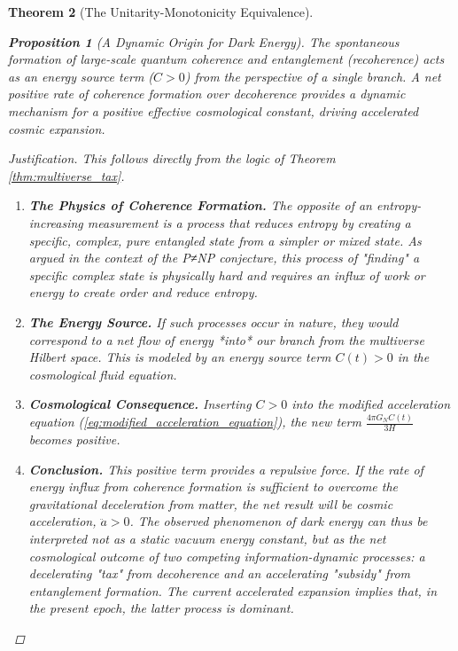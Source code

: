 \documentclass[11pt, letterpaper]{report}
\theoremstyle{plain} %
\newtheorem{theorem}{Theorem}[chapter]
\newtheorem{proposition}[theorem]{Proposition}
\theoremstyle{definition} %
\theoremstyle{remark} %
\begin{document}
\begin{theorem}[The Unitarity-Monotonicity Equivalence]
\begin{proposition}[A Dynamic Origin for Dark Energy]
\label{prop:explore_dark_energy}
The spontaneous formation of large-scale quantum coherence and entanglement (recoherence) acts as an energy source term ($C > 0$) from the perspective of a single branch. A net positive rate of coherence formation over decoherence provides a dynamic mechanism for a positive effective cosmological constant, driving accelerated cosmic expansion.
\end{proposition}
\begin{proof}[Justification]
This follows directly from the logic of Theorem \ref{thm:multiverse_tax}.
\begin{enumerate}
    \item \textbf{The Physics of Coherence Formation.} The opposite of an entropy-increasing measurement is a process that reduces entropy by creating a specific, complex, pure entangled state from a simpler or mixed state. As argued in the context of the P≠NP conjecture, this process of "finding" a specific complex state is physically hard and requires an influx of work or energy to create order and reduce entropy.
    \item \textbf{The Energy Source.} If such processes occur in nature, they would correspond to a net flow of energy *into* our branch from the multiverse Hilbert space. This is modeled by an energy source term $C(t) > 0$ in the cosmological fluid equation.
    \item \textbf{Cosmological Consequence.} Inserting $C > 0$ into the modified acceleration equation (\cref{eq:modified_acceleration_equation}), the new term $\frac{4\pi G_N C(t)}{3H}$ becomes positive.
    \item \textbf{Conclusion.} This positive term provides a repulsive force. If the rate of energy influx from coherence formation is sufficient to overcome the gravitational deceleration from matter, the net result will be cosmic acceleration, $\ddot{a}>0$. The observed phenomenon of dark energy can thus be interpreted not as a static vacuum energy constant, but as the net cosmological outcome of two competing information-dynamic processes: a decelerating "tax" from decoherence and an accelerating "subsidy" from entanglement formation. The current accelerated expansion implies that, in the present epoch, the latter process is dominant.
\end{enumerate}
\end{proof}








\end{theorem}
\end{document}
